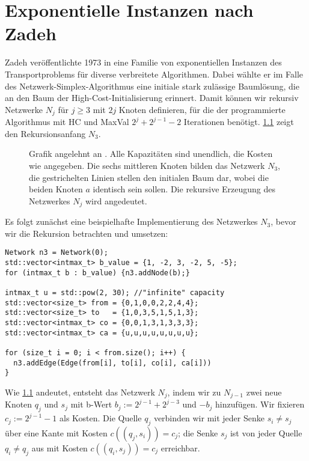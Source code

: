 \chapter{Exponentielle Instanzen nach Zadeh}\label{ch:lit}
Zadeh veröffentlichte 1973 in \cite{Exponential} eine Familie von exponentiellen Instanzen des Transportproblems für diverse verbreitete Algorithmen. Dabei wählte er im Falle des Netzwerk-Simplex-Algorithmus eine initiale stark zulässige Baumlösung, die an den Baum der High-Cost-Initialisierung erinnert. Damit können wir rekursiv Netzwerke $N_j$ für $j\geq 3$ mit $2j$ Knoten definieren, für die der programmierte Algorithmus mit HC und MaxVal $2^j + 2^{j-1} - 2$ Iterationen benötigt. \cref{fig:N3} zeigt den Rekursionsanfang $N_3$.
\begin{figure}[!ht]\centering
    
    \caption{Grafik angelehnt an \cite[S. 261]{Exponential}. Alle Kapazitäten sind unendlich, die Kosten wie angegeben. Die sechs mittleren Knoten bilden das Netzwerk $N_3$, die gestrichelten Linien stellen den initialen Baum dar, wobei die beiden Knoten $a$ identisch sein sollen. Die rekursive Erzeugung des Netzwerkes $N_j$ wird angedeutet.}
    \label{fig:N3}
\end{figure}

Es folgt zunächst eine beispielhafte Implementierung des Netzwerkes $N_3$, bevor wir die Rekursion betrachten und umsetzen:

\begin{lstlisting}
Network n3 = Network(0);
std::vector<intmax_t> b_value = {1, -2, 3, -2, 5, -5};
for (intmax_t b : b_value) {n3.addNode(b);}

intmax_t u = std::pow(2, 30); //"infinite" capacity
std::vector<size_t> from = {0,1,0,0,2,2,4,4};
std::vector<size_t> to   = {1,0,3,5,1,5,1,3};
std::vector<intmax_t> co = {0,0,1,3,1,3,3,3};
std::vector<intmax_t> ca = {u,u,u,u,u,u,u,u};

for (size_t i = 0; i < from.size(); i++) {
  n3.addEdge(Edge(from[i], to[i], co[i], ca[i]))
}
\end{lstlisting}

Wie \cref{fig:N3} andeutet, entsteht das Netzwerk $N_j$, indem wir zu $N_{j-1}$ zwei neue Knoten $q_j$ und $s_j$ mit b-Wert $b_j:=2^{j-1} + 2^{j-3}$ und $-b_j$ hinzufügen. Wir fixieren $c_j:=2^{j-1}-1$ als Kosten. Die Quelle $q_j$ verbinden wir mit jeder Senke $s_i\neq s_j$ über eine Kante mit Kosten $c((q_j,s_i))=c_j$; die Senke $s_j$ ist von jeder Quelle $q_i\neq q_j$ aus mit Kosten $c((q_i,s_j))=c_j$ erreichbar.

